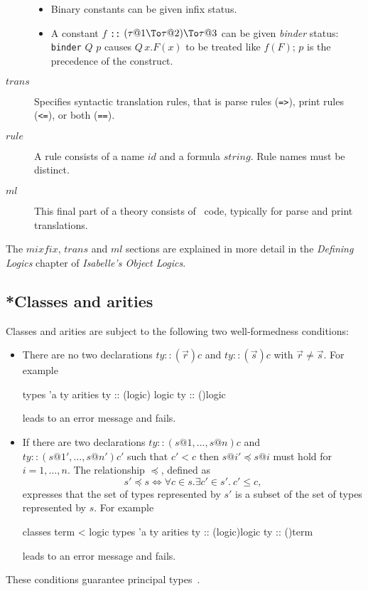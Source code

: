 \begin{description}
\begin{itemize}
  \item Binary constants can be given infix status.

  \item A constant $f$ {\tt::} $(\tau@1\To\tau@2)\To\tau@3$ can be given {\em
    binder\/} status: {\tt binder} $Q$ $p$ causes $Q\,x.F(x)$ to be treated
  like $f(F)$; $p$ is the precedence of the construct.
  \end{itemize}
\item[$trans$] Specifies syntactic translation rules, that is parse 
  rules ({\tt =>}), print rules ({\tt <=}), or both ({\tt ==}).
\item[$rule$] A rule consists of a name $id$ and a formula $string$.  Rule
  names must be distinct.
\item[$ml$] This final part of a theory consists of \ML\ code, 
  typically for parse and print translations.
\end{description}
The $mixfix$, $trans$ and $ml$ sections are explained in more detail in 
the {\it Defining Logics} chapter of {\it Isabelle's Object Logics}.


\subsection{*Classes and arities}

Classes and arities are subject to the following two well-formedness
conditions:
\begin{itemize}
\item There are no two declarations $ty :: (\vec{r})c$ and $ty :: (\vec{s})c$
  with $\vec{r} \neq \vec{s}$.  For example
\begin{ttbox}
types 'a ty
arities ty :: ({\ttlbrace}logic{\ttrbrace}) logic
        ty :: ({\ttlbrace}{\ttrbrace})logic
\end{ttbox}
leads to an error message and fails.
\item If there are two declarations $ty :: (s@1,\dots,s@n)c$ and $ty ::
  (s@1',\dots,s@n')c'$ such that $c' < c$ then $s@i' \preceq s@i$ must hold
  for $i=1,\dots,n$.  The relationship $\preceq$, defined as
\[ s' \preceq s \iff \forall c\in s. \exists c'\in s'.~ c'\le c, \]
expresses that the set of types represented by $s'$ is a subset of the set of
types represented by $s$.  For example
\begin{ttbox}
classes term < logic
types 'a ty
arities ty :: ({\ttlbrace}logic{\ttrbrace})logic
        ty :: ({\ttlbrace}{\ttrbrace})term
\end{ttbox}
leads to an error message and fails.
\end{itemize}
These conditions guarantee principal types~\cite{nipkow-prehofer}.


